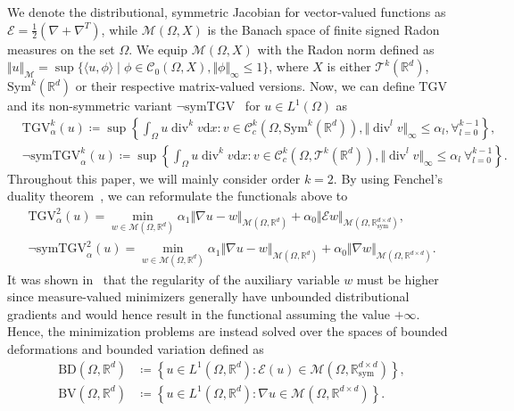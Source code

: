 \documentclass{article}
\DeclareMathOperator{\Div}{div}
\newcommand{\dx}{\mathrm{d}}
\newcommand{\R}{\mathbb{R}}
\newcommand{\TGV}{\mathrm{TGV}}
\newcommand{\NSymTGV}{\neg \mathrm{symTGV}}
\newcommand{\BV}{\mathrm{BV}}
\newcommand{\BD}{\mathrm{BD}}
\begin{document}
	We denote the distributional, symmetric Jacobian for vector-valued functions as $\mathcal{E} = \frac{1}{2}(\nabla + \nabla^T)$, while $\mathcal{M}(\Omega, X)$ is the Banach space of finite signed Radon measures on the set $\Omega$.
	We equip $\mathcal{M}(\Omega, X)$ with the Radon norm defined as $\Vert u \Vert_{\mathcal{M}} = \sup \lbrace  \langle u, \phi\rangle \mid \phi \in \mathcal{C}_0(\Omega, X), \Vert\phi\Vert_\infty \leq 1 \rbrace$, where $X$ is either $\mathcal{T}^k(\mathbb{R}^d)$, $\mathrm{Sym}^k(\mathbb{R}^d)$ or their respective matrix-valued versions.
	Now, we can define $\TGV$ and its non-symmetric variant $\NSymTGV$~\cite{Br10} for $u\in L^1(\Omega)$ as
	\begin{align}
		\label{def:TGV}
		&\TGV_\alpha^k(u) \coloneqq \sup \left \lbrace  \int_\Omega u \Div^kv \dx x\colon v \in \mathcal{C}_c^k(\Omega, \mathrm{Sym}^k(\R^d)),  \Vert \Div^lv\Vert _\infty \leq \alpha_l, {\forall}_{l=0}^{k-1}  \right \rbrace,\\
		\label{def:NSymTGV}
		&\NSymTGV_\alpha^k(u) \coloneqq \sup \left \lbrace  \int_\Omega u \Div^kv \dx x\colon v \in \mathcal{C}_c^k(\Omega, \mathcal{T}^k(\R^d)), \Vert \Div^lv\Vert _\infty \leq \alpha_l\ {\forall}_{l=0}^{k-1} \right \rbrace.
	\end{align}
	Throughout this paper, we will mainly consider order $k=2$.
	By using Fenchel's duality theorem~\cite[Theorem~3.5]{Br14}, we can reformulate the functionals above to
	\begin{align}
		\TGV_{\alpha}^2 (u)= \min_{w\in \mathcal{M}(\Omega, \R^d)} \alpha_1 \Vert \nabla u - w\Vert_{\mathcal{M}(\Omega, \R^d)} +  \alpha_0 \Vert \mathcal{E} w\Vert _{\mathcal{M}(\Omega,\mathbb{R}^{d \times d}_{\mathrm{sym}})},\label{eq:characterizationTGV}\\
		\NSymTGV_{\alpha}^2 (u)= \min_{w\in \mathcal{M}(\Omega, \R^d)} \alpha_1 \Vert \nabla u - w\Vert _{\mathcal{M}(\Omega, \R^d)} +  \alpha_0\Vert \nabla w\Vert _{\mathcal{M}(\Omega, \R^{d\times d})}.\label{eq:characterizationNsymTGV}
	\end{align}
	It was shown in~\cite[Theorem~3.5]{Br14} that the regularity of the auxiliary variable $w$ must be higher since measure-valued minimizers generally have unbounded distributional gradients and would hence result in the functional assuming the value $+ \infty$.
	Hence, the minimization problems are instead solved over the spaces of bounded deformations and bounded variation defined as
	\begin{align*}
		\BD(\Omega, \R^d) &\coloneqq \left\lbrace u \in L^1(\Omega, \R^d) \colon \mathcal{E}(u)\in \mathcal{M}(\Omega, \mathbb{R}^{d \times d}_{\mathrm{sym}})\right\rbrace,\\
		\BV(\Omega, \R^d) &\coloneqq \left\lbrace u \in L^1(\Omega, \R^d) \colon \nabla u\in \mathcal{M}(\Omega, \mathbb{R}^{d \times d})\right\rbrace.
	\end{align*}
\end{document}
